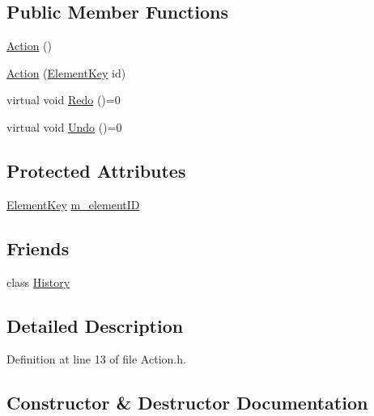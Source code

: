 \subsection*{Public Member Functions}
\begin{DoxyCompactItemize}
\item 
\hyperlink{class_action_a4f457ccfc8336b565cadca56b36e0271}{Action} ()
\item 
\hyperlink{class_action_ab361b73e8653f33eee6b13b76d77bc62}{Action} (\hyperlink{_graphical_element_8h_ade5fd6c85839a416577ff9de1605141e}{Element\+Key} id)
\item 
virtual void \hyperlink{class_action_a69864cea344385ee84a5120eaab5d82a}{Redo} ()=0
\item 
virtual void \hyperlink{class_action_aab28a6693a01e51712ccbf4d24b6015e}{Undo} ()=0
\end{DoxyCompactItemize}
\subsection*{Protected Attributes}
\begin{DoxyCompactItemize}
\item 
\hyperlink{_graphical_element_8h_ade5fd6c85839a416577ff9de1605141e}{Element\+Key} \hyperlink{class_action_aa7b19bcb67e58c39675df7204d593b89}{m\+\_\+element\+ID}
\end{DoxyCompactItemize}
\subsection*{Friends}
\begin{DoxyCompactItemize}
\item 
class \hyperlink{class_action_a12790c6b4f2fb95ff77fbfec4dd07867}{History}
\end{DoxyCompactItemize}


\subsection{Detailed Description}


Definition at line 13 of file Action.\+h.



\subsection{Constructor \& Destructor Documentation}
\mbox{\label{class_action_a4f457ccfc8336b565cadca56b36e0271}} 

